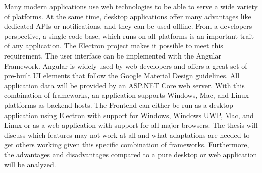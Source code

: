 

Many modern applications use web technologies to be able to serve a wide variety of platforms. At the same time, desktop applications offer many advantages like dedicated APIs or notifications, and they can be used offline. From a developers perspective, a single code base, which runs on all platforms is an important trait of any application. The Electron project makes it possible to meet this requirement. The user interface can be implemented with the Angular Framework. Angular is widely used by web developers and offers a great set of pre-built UI elements that follow the Google Material Design guidelines. All application data will be provided by an ASP.NET Core web server. With this combination of frameworks, an application supports Windows, Mac, and Linux plattforms as backend hosts. The Frontend can either be run as a desktop application using Electron with support for Windows, Windows UWP, Mac, and Linux or as a web application with support for all major browsers. The thesis will discuss which features may not work at all and what adaptations are needed to get others working given this specific combination of frameworks. Furthermore, the advantages and disadvantages compared to a pure desktop or web application will be analyzed.
